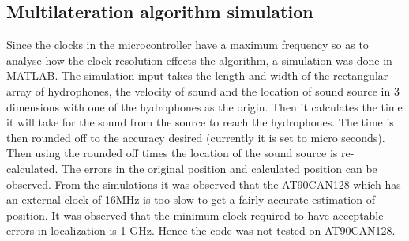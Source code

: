 \subsection{Multilateration algorithm simulation}
Since the clocks in the microcontroller have a maximum frequency so as to analyse how the clock resolution effects the algorithm, a simulation was done in MATLAB. The simulation input takes the length and width of the rectangular array of hydrophones, the velocity of sound and the location of sound source in 3 dimensions with one of the hydrophones as the origin. Then it calculates the time it will take for the sound from the source to reach the hydrophones. The time is then rounded off to the accuracy desired (currently it is set to micro seconds). Then using the rounded off times the location of the sound source is re-calculated. The errors in the original position and calculated position can be observed.\newline
From the simulations it was observed that the AT90CAN128 which has an external clock of 16MHz is too slow to get a fairly accurate estimation of position. It was observed that the minimum clock required to have acceptable errors in localization is 1 GHz. Hence the code was not tested on AT90CAN128.
%